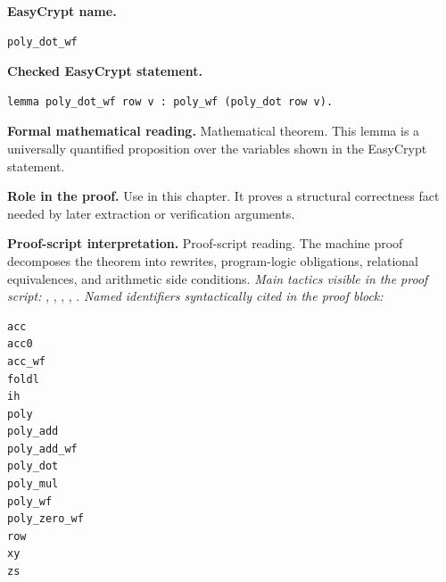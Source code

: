 \begin{formaltheorem}
\noindent\textbf{EasyCrypt name.}
\begin{lstlisting}[language=EasyCrypt,basicstyle=\ttfamily\scriptsize]
poly_dot_wf
\end{lstlisting}
\noindent\textbf{Checked EasyCrypt statement.}
\begin{lstlisting}[language=EasyCrypt,basicstyle=\ttfamily\scriptsize]
lemma poly_dot_wf row v : poly_wf (poly_dot row v).
\end{lstlisting}
\noindent\textbf{Formal mathematical reading.}
Mathematical theorem. This lemma is a universally quantified proposition over the variables shown in the EasyCrypt statement.

\noindent\textbf{Role in the proof.}
Use in this chapter. It proves a structural correctness fact needed by later extraction or verification arguments.

\noindent\textbf{Proof-script interpretation.}
Proof-script reading. The machine proof decomposes the theorem into rewrites, program-logic obligations, relational equivalences, and arithmetic side conditions.
\emph{Main tactics visible in the proof script:} , , , , .
\emph{Named identifiers syntactically cited in the proof block:}
\begin{lstlisting}[language=EasyCrypt,basicstyle=\ttfamily\scriptsize]
acc
acc0
acc_wf
foldl
ih
poly
poly_add
poly_add_wf
poly_dot
poly_mul
poly_wf
poly_zero_wf
row
xy
zs
\end{lstlisting}

\end{formaltheorem}

